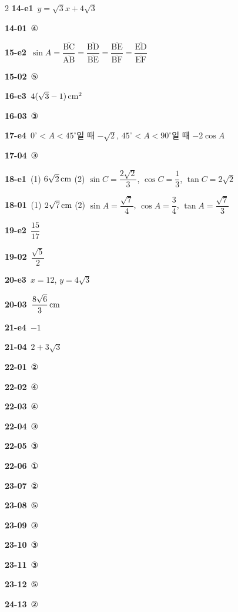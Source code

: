 \documentclass[10pt,a4paper]{article}
\newcommand{\seg}[1]{\overline{\mathrm{#1}}}
\begin{document}
\begin{multicols}{2}
\noindent\textbf{14-e1}\ $y=\sqrt{3}x+4\sqrt{3}$\par
\noindent\textbf{14-01}\ ④\par
\noindent\textbf{15-e2}\ $\sin A=\dfrac{\seg{BC}}{\seg{AB}}=\dfrac{\seg{BD}}{\seg{BE}}=\dfrac{\seg{BE}}{\seg{BF}}=\dfrac{\seg{ED}}{\seg{EF}}$\par
\noindent\textbf{15-02}\ ⑤\par
\noindent\textbf{16-e3}\ $4(\sqrt{3}-1)\mkern3mu \mathrm{cm}^2$\par
\noindent\textbf{16-03}\ ③\par
\noindent\textbf{17-e4}\ $0^\circ<A<45^\circ$일 때 $-\sqrt{2}$, $45^\circ<A<90^\circ$일 때 $-2\cos A$\par
\noindent\textbf{17-04}\ ③\par
\noindent\textbf{18-e1}\ (1) $6\sqrt{2}\mkern3mu \mathrm{cm}$ (2) $\sin C=\dfrac{2\sqrt{2}}{3}$, $\cos C=\dfrac{1}{3}$, $\tan C=2\sqrt{2}$\par
\noindent\textbf{18-01}\ (1) $2\sqrt{7}\mkern3mu \mathrm{cm}$ (2) $\sin A=\dfrac{\sqrt{7}}{4}$, $\cos A=\dfrac{3}{4}$, $\tan A=\dfrac{\sqrt{7}}{3}$\par
\noindent\textbf{19-e2}\ $\dfrac{15}{17}$\par
\noindent\textbf{19-02}\ $\dfrac{\sqrt{5}}{2}$\par
\noindent\textbf{20-e3}\ $x=12$, $y=4\sqrt{3}$\par
\noindent\textbf{20-03}\ $\dfrac{8\sqrt{6}}{3}\mkern3mu \mathrm{cm}$\par
\noindent\textbf{21-e4}\ $-1$\par
\noindent\textbf{21-04}\ $2+3\sqrt{3}$\par
\noindent\textbf{22-01}\ ②\par
\noindent\textbf{22-02}\ ④\par
\noindent\textbf{22-03}\ ④\par
\noindent\textbf{22-04}\ ③\par
\noindent\textbf{22-05}\ ③\par
\noindent\textbf{22-06}\ ①\par
\noindent\textbf{23-07}\ ②\par
\noindent\textbf{23-08}\ ⑤\par
\noindent\textbf{23-09}\ ③\par
\noindent\textbf{23-10}\ ③\par
\noindent\textbf{23-11}\ ③\par
\noindent\textbf{23-12}\ ⑤\par
\noindent\textbf{24-13}\ ②\par

\end{multicols}
\end{document}
